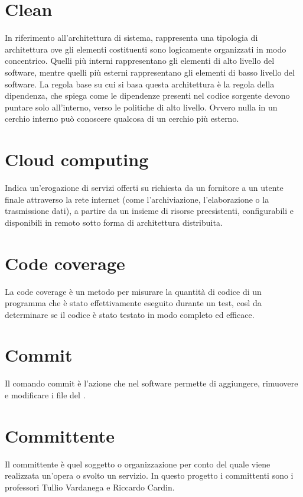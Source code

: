 \section{Clean}\label{sec:Clean Architecture}
In riferimento all'architettura di sistema, rappresenta una tipologia di architettura ove gli elementi costituenti sono logicamente organizzati in modo concentrico. Quelli più interni rappresentano gli elementi di alto livello del software, mentre quelli più esterni rappresentano gli elementi di basso livello del software. La regola base su cui si basa questa architettura è la regola della dipendenza, che spiega come le dipendenze presenti nel codice sorgente devono puntare solo all'interno, verso le politiche di alto livello. Ovvero nulla in un cerchio interno può conoscere qualcosa di un cerchio più esterno.

\section{Cloud computing}\label{sec:Cloud}
Indica un'erogazione di servizi offerti su richiesta da un fornitore a un utente finale attraverso la rete internet (come l'archiviazione, l'elaborazione o la trasmissione dati), a partire da un insieme di risorse preesistenti, configurabili e disponibili in remoto sotto forma di architettura distribuita.

\section{Code coverage}
La code coverage è un metodo per misurare la quantità di codice di un programma che è stato effettivamente eseguito durante un test, così da determinare se il codice è stato testato in modo completo ed efficace.

\section{Commit}\label{sec:Commits}
Il comando commit è l'azione che nel software  permette di aggiungere, rimuovere e modificare i file del .

\section{Committente}\label{sec:Committenti}
Il committente è quel soggetto o organizzazione per conto del quale viene realizzata un'opera o svolto un servizio. In questo progetto i committenti sono i professori Tullio Vardanega e Riccardo Cardin.


